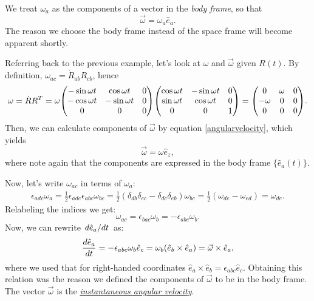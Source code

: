 \documentclass{article}
\begin{document}
We treat $\omega_a$ as the components of a vector in the \textit{body frame}, so that
\begin{equation}
    \vec{\omega} = \omega_a \hat{e}_a.
\end{equation}
The reason we choose the body frame instead of the space frame will become apparent shortly. 
\begin{example}
	Referring back to the previous example, let's look at $ \omega $ and $ \vec{\omega} $ given $ R(t) $. By definition, $ \omega_{ac} = \dot{R}_{ab} R_{cb} $, hence
	\[
	\omega = \dot{R} R^{T} = \omega \mqty(-\sin \omega t & \cos \omega t & 0 \\ -\cos \omega t & -\sin \omega t & 0 \\ 0 & 0 & 0) \mqty(\cos \omega t & -\sin \omega t & 0 \\ \sin \omega t & \cos \omega t & 0 \\ 0 & 0 & 1) = \mqty(0 & \omega & 0 \\ -\omega & 0 & 0 \\ 0 & 0 & 0).
	\]
	Then, we can calculate components of $ \vec{\omega} $ by equation \eqref{angularvelocity}, which yields
	\[
	\vec{\omega} = \omega \hat{e}_{z},
	\]
	where note again that the components are expressed in the body frame $ \{\hat{e}_{a}(t)\} $.
\end{example}
\par
Now, let's write $\omega_{ac}$ in terms of $\omega_a$:
\begin{align*}
    \epsilon_{ade} \omega_a = \frac{1}{2} \epsilon_{ade} \epsilon_{abc} \omega_{bc} 
    = \frac{1}{2} (\delta_{db}\delta_{ec} - \delta_{dc}\delta_{eb}) \omega_{bc} 
    = \frac{1}{2} (\omega_{de} - \omega_{ed}) 
    = \omega_{de}.
\end{align*}
Relabeling the indices we get:
\begin{equation}
    \omega_{ac} = \epsilon_{bac}\omega_{b} = - \epsilon_{abc} \omega_b.
\end{equation}
Now, we can rewrite $\dv*{\hat{e}_a}{t}$ as:
\begin{equation} \label{rotatingframe1}
    \dv{\hat{e}_a}{t} = -\epsilon_{abc} \omega_b \hat{e}_c = \omega_b (\hat{e}_b \times \hat{e}_a) = \vec{\omega} \times \hat{e}_a,
\end{equation}
where we used that for right-handed coordinates $\hat{e}_a \times \hat{e}_b = \epsilon_{abc} \hat{e}_c$. Obtaining this relation was the reason we defined the components of $\vec{\omega}$ to be in the body frame. The vector $\vec{\omega}$ is the \href{https://en.wikipedia.org/wiki/Angular_velocity}{\textit{instantaneous angular velocity}}.
\end{document}
